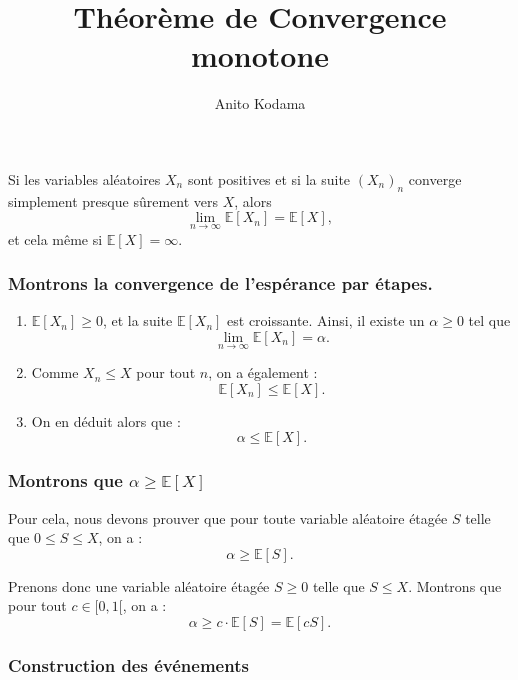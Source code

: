 

\usepackage{amsmath, amssymb}
\author{Anito Kodama}
\title{Théorème de Convergence monotone}

\maketitle

Si les variables aléatoires $X_n$ sont positives et si la suite $(X_n)_n$ converge simplement presque sûrement vers $X$, alors
$$ \lim_{n \to \infty} \mathbb{E}[X_n] = \mathbb{E}[X], $$ 
et cela même si $\mathbb{E}[X] = \infty$.
\ep

\bpf

\subsubsection*{Montrons la convergence de l'espérance par étapes.}

\begin{enumerate}
    \item $\mathbb{E}[X_n] \geq 0$, et la suite $\mathbb{E}[X_n]$ est croissante. Ainsi, il existe un $\alpha \geq 0$ tel que
    $$ \lim_{n \to \infty} \mathbb{E}[X_n] = \alpha. $$

    \item Comme $X_n \leq X$ pour tout $n$, on a également :
    $$ \mathbb{E}[X_n] \leq \mathbb{E}[X]. $$

    \item On en déduit alors que :
    $$ \alpha \leq \mathbb{E}[X]. $$
\end{enumerate}

\subsubsection*{Montrons que $\alpha \geq \mathbb{E}[X]$}

Pour cela, nous devons prouver que pour toute variable aléatoire étagée \( S \) telle que \( 0 \leq S \leq X \), on a :
$$ \alpha \geq \mathbb{E}[S]. $$

Prenons donc une variable aléatoire étagée \( S \geq 0 \) telle que \( S \leq X \). Montrons que pour tout \( c \in [0, 1[ \), on a :
$$ \alpha \geq c \cdot \mathbb{E}[S] = \mathbb{E}[cS]. $$

\subsubsection*{Construction des événements}

